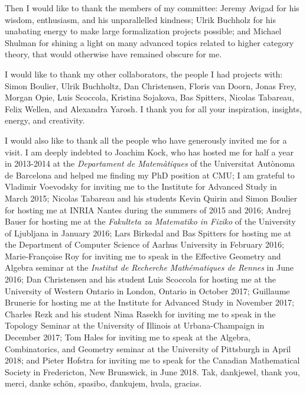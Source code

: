 Then I would like to thank the members of my committee: Jeremy Avigad for his wisdom, enthusiasm, and his unparallelled kindness; Ulrik Buchholz for his unabating energy to make large formalization projects possible; and Michael Shulman for shining a light on many advanced topics related to higher category theory, that would otherwise have remained obscure for me.

I would like to thank my other collaborators, the people I had projects with:
Simon Boulier, Ulrik Buchholtz, Dan Christensen, Floris van Doorn, Jonas Frey, Morgan Opie, Luis Scoccola, Kristina Sojakova, Bas Spitters, Nicolas Tabareau, Felix Wellen, and Alexandra Yarosh. I thank you for all your inspiration, insights, energy, and creativity.

I would also like to thank all the people who have generously invited me for a visit. I am deeply indebted to Joachim Kock, who has hosted me for half a year in 2013-2014 at the \textit{Departament de Matemàtiques} of the Universitat Autònoma de Barcelona and helped me finding my PhD position at CMU; I am grateful to Vladimir Voevodsky for inviting me to the Institute for Advanced Study in March 2015; Nicolas Tabareau and his students Kevin Quirin and Simon Boulier for hosting me at INRIA Nantes during the summers of 2015 and 2016; Andrej Bauer for hosting me at the \textit{Fakulteta za Matematiko in Fiziko} of the University of Ljubljana in January 2016; Lars Birkedal and Bas Spitters for hosting me at the Department of Computer Science of Aarhus University in February 2016; Marie-Françoise Roy for inviting me to speak in the Effective Geometry and Algebra seminar at the \textit{Institut de Recherche Mathématiques de Rennes} in June 2016; Dan Christensen and his student Luis Scoccola for hosting me at the University of Western Ontario in London, Ontario in October 2017; Guillaume Brunerie for hosting me at the Institute for Advanced Study in November 2017; Charles Rezk and his student Nima Rasekh for inviting me to speak in the Topology Seminar at the University of Illinois at Urbana-Champaign in December 2017; Tom Hales for inviting me to speak at the Algebra, Combinatorics, and Geometry seminar at the University of Pittsburgh in April 2018; and Pieter Hofstra for inviting me to speak for the Canadian Mathematical Society in Fredericton, New Brunswick, in June 2018. Tak, dankjewel, thank you, merci, danke sch\"on, spasibo, \v dankujem, hvala, gracias.

